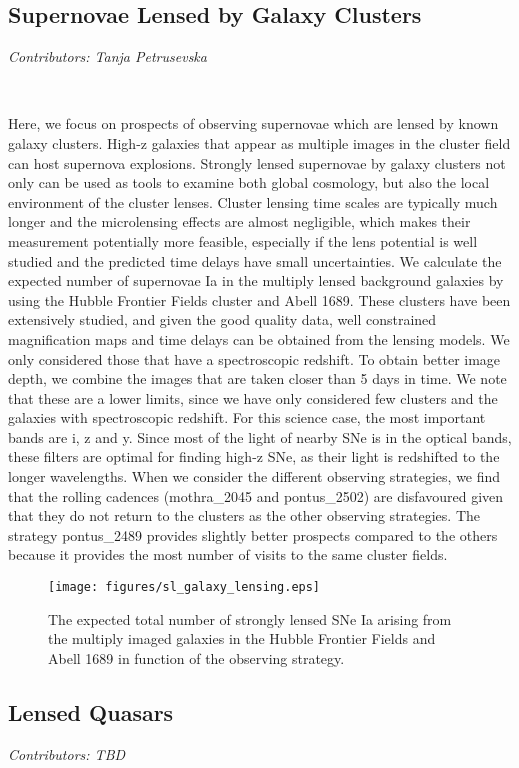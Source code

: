\subsection{Supernovae Lensed by Galaxy Clusters}
\textit{Contributors: Tanja Petrusevska}

\

Here, we focus on prospects of observing supernovae which are
lensed by known galaxy clusters. High-z galaxies that appear as
multiple images in the cluster field can host supernova
explosions. Strongly lensed supernovae by galaxy clusters not only
can be used as tools to examine both global cosmology, but also
the local environment of the cluster lenses. Cluster lensing time
scales are typically much longer and the microlensing effects are
almost negligible, which makes their measurement potentially more
feasible, especially if the lens potential is well studied and the
predicted time delays have small uncertainties. We calculate the
expected number of supernovae Ia in the multiply lensed background
galaxies by using the Hubble Frontier Fields cluster and Abell
1689. These clusters have been extensively studied, and given the
good quality data, well constrained magnification maps and time
delays can be obtained from the lensing models. We only considered
those that have a spectroscopic redshift. To obtain better image
depth, we combine the images that are taken closer than 5 days in
time. We note that these are a lower limits, since we have only
considered few clusters and the galaxies with spectroscopic
redshift. For this science case, the most important bands are i, z
and y. Since most of the light of nearby SNe is in the optical
bands, these filters are optimal for finding high-z SNe, as their
light is redshifted to the longer wavelengths. When we consider
the different observing strategies, we find that the rolling
cadences (mothra\_2045 and pontus\_2502) are disfavoured given that
they do not return to the clusters as the other observing
strategies. The strategy pontus\_2489 provides slightly better
prospects compared to the others because it provides the most
number of visits to the same cluster fields.

\begin{figure}
\centering
\texttt{[image: figures/sl\_galaxy\_lensing.eps]}\caption{The expected total number of strongly lensed SNe Ia arising from the multiply imaged galaxies in the Hubble Frontier Fields and Abell 1689 in function of the observing strategy. }
\end{figure}


\subsection{Lensed Quasars}
\textit{Contributors: TBD}
